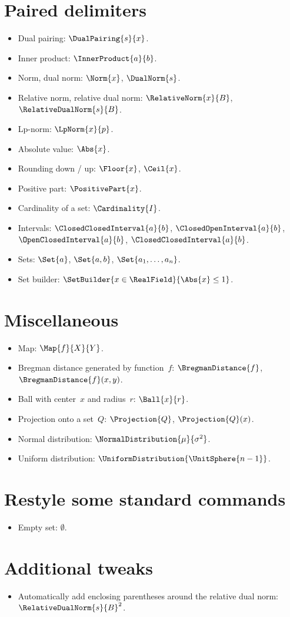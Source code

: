 \documentclass{article}
\begin{document}
  \section{Paired delimiters}

  \begin{itemize}
    \item Dual pairing: $\DualPairing{s}{x}$.
    \item Inner product: $\InnerProduct{a}{b}$.
    \item Norm, dual norm: $\Norm{x}$, $\DualNorm{s}$.
    \item Relative norm, relative dual norm: $\RelativeNorm{x}{B}$, $\RelativeDualNorm{s}{B}$.
    \item Lp-norm: $\LpNorm{x}{p}$.
    \item Absolute value: $\Abs{x}$.
    \item Rounding down / up: $\Floor{x}$, $\Ceil{x}$.
    \item Positive part: $\PositivePart{x}$.
    \item Cardinality of a set: $\Cardinality{I}$.
    \item Intervals: $\ClosedClosedInterval{a}{b}$, $\ClosedOpenInterval{a}{b}$, $\OpenClosedInterval{a}{b}$,
    $\ClosedClosedInterval{a}{b}$.
    \item Sets: $\Set{a}$, $\Set{a, b}$, $\Set{a_1, \dots, a_n}$.
    \item Set builder: $\SetBuilder{x \in \RealField}{\Abs{x} \leq 1}$.
  \end{itemize}

  \section{Miscellaneous}

  \begin{itemize}
    \item Map: $\Map{f}{X}{Y}$.
    \item Bregman distance generated by function~$f$: $\BregmanDistance{f}$, $\BregmanDistance{f}(x, y)$.
    \item Ball with center~$x$ and radius~$r$: $\Ball{x}{r}$.
    \item Projection onto a set~$Q$: $\Projection{Q}$, $\Projection{Q}(x)$.
    \item Normal distribution: $\NormalDistribution{\mu}{\sigma^2}$.
    \item Uniform distribution: $\UniformDistribution{\UnitSphere{n - 1}}$.
  \end{itemize}

  \section{Restyle some standard commands}

  \begin{itemize}
    \item Empty set: $\emptyset$.
  \end{itemize}

  \section{Additional tweaks}

  \begin{itemize}
    \item Automatically add enclosing parentheses around the relative dual norm: $\RelativeDualNorm{s}{B}^2$.
  \end{itemize}
\end{document}
